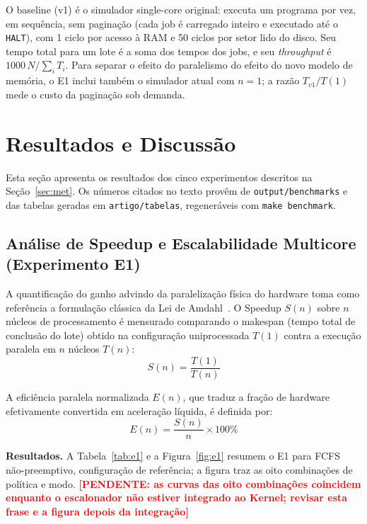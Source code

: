 \documentclass[conference]{IEEEtran}
\newcommand{\pendente}[1]{\textcolor{red}{\textbf{[PENDENTE: #1]}}}
\begin{document}
O baseline (v1) é o simulador single-core original: executa um programa por vez, em sequência, sem paginação (cada job é carregado inteiro e executado até o \texttt{HALT}), com 1 ciclo por acesso à RAM e 50 ciclos por setor lido do disco. Seu tempo total para um lote é a soma dos tempos dos jobs, e seu \textit{throughput} é $1000\,N / \sum_i T_i$. Para separar o efeito do paralelismo do efeito do novo modelo de memória, o E1 inclui também o simulador atual com $n = 1$; a razão $T_{v1}/T(1)$ mede o custo da paginação sob demanda.

\section{Resultados e Discussão}
\label{sec:res}

Esta seção apresenta os resultados dos cinco experimentos descritos na Seção~\ref{sec:met}. Os números citados no texto provêm de \texttt{output/benchmarks} e das tabelas geradas em \texttt{artigo/tabelas}, regeneráveis com \texttt{make benchmark}.

\subsection{Análise de Speedup e Escalabilidade Multicore (Experimento E1)}
\label{sec:e1}
A quantificação do ganho advindo da paralelização física do hardware toma como referência a formulação clássica da Lei de Amdahl~\cite{amdahl1967}. O Speedup $S(n)$ sobre $n$ núcleos de processamento é mensurado comparando o makespan (tempo total de conclusão do lote) obtido na configuração uniprocessada $T(1)$ contra a execução paralela em $n$ núcleos $T(n)$:
\begin{equation}
S(n) = \frac{T(1)}{T(n)}
\end{equation}

A eficiência paralela normalizada $E(n)$, que traduz a fração de hardware efetivamente convertida em aceleração líquida, é definida por:
\begin{equation}
E(n) = \frac{S(n)}{n} \times 100\%
\end{equation}

\textbf{Resultados.} A Tabela~\ref{tab:e1} e a Figura~\ref{fig:e1} resumem o E1 para FCFS não-preemptivo, configuração de referência; a figura traz as oito combinações de política e modo. \pendente{as curvas das oito combinações coincidem enquanto o escalonador não estiver integrado ao Kernel; revisar esta frase e a figura depois da integração}
\end{document}
